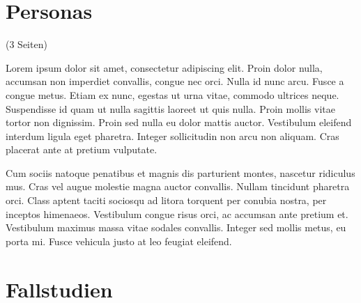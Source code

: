 \section{Personas}
\label{sec:personas}

(3 Seiten)

Lorem ipsum dolor sit amet, consectetur adipiscing elit. Proin dolor nulla, accumsan non imperdiet convallis, congue nec orci. Nulla id nunc arcu. Fusce a congue metus. Etiam ex nunc, egestas ut urna vitae, commodo ultrices neque. Suspendisse id quam ut nulla sagittis laoreet ut quis nulla. Proin mollis vitae tortor non dignissim. Proin sed nulla eu dolor mattis auctor. Vestibulum eleifend interdum ligula eget pharetra. Integer sollicitudin non arcu non aliquam. Cras placerat ante at pretium vulputate.

Cum sociis natoque penatibus et magnis dis parturient montes, nascetur ridiculus mus. Cras vel augue molestie magna auctor convallis. Nullam tincidunt pharetra orci. Class aptent taciti sociosqu ad litora torquent per conubia nostra, per inceptos himenaeos. Vestibulum congue risus orci, ac accumsan ante pretium et. Vestibulum maximus massa vitae sodales convallis. Integer sed mollis metus, eu porta mi. Fusce vehicula justo at leo feugiat eleifend.


\clearpage
\section{Fallstudien}
\label{sec:fallstudien}


